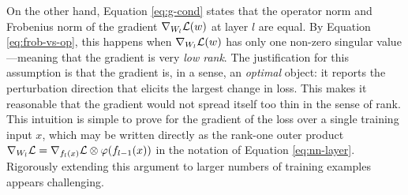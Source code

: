 \begin{refsection}
On the other hand, Equation \ref{eq:g-cond} states that the operator norm and Frobenius norm of the gradient $\nabla_{W_l}\mathcal{L}(w)$ at layer $l$ are equal. By Equation \ref{eq:frob-vs-op}, this happens when $\nabla_{W_l}\mathcal{L}(w)$ has only one non-zero singular value---meaning that the gradient is very \textit{low rank}. The justification for this assumption is that the gradient is, in a sense, an \textit{optimal} object: it reports the perturbation direction that elicits the largest change in loss. This makes it reasonable that the gradient would not spread itself too thin in the sense of rank. This intuition is simple to prove for the gradient of the loss over a single training input $x$, which may be written directly as the rank-one outer product $\nabla_{W_l} \mathcal{L} = \nabla_{f_l(x)}\mathcal{L}\otimes \varphi(f_{l-1}(x))$ in the notation of Equation \ref{eq:nn-layer}. Rigorously extending this argument to larger numbers of training examples appears challenging.


\end{refsection}
